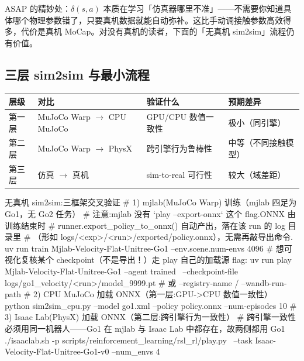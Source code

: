 \begin{insight}\label{ins:rlmc-phys-asap}
ASAP 的精妙处：$\delta(s,a)$ 本质在学习「仿真器哪里不准」——不需要你知道具体哪个物理参数错了，只要真机数据就能自动弥补。这比手动调接触参数高效得多，代价是真机 MoCap。对没有真机的读者，下面的「无真机 sim2sim」流程仍有价值。
\end{insight}

\subsection{三层 sim2sim 与最小流程}

\begin{center}
\small
\begin{tabular}{@{}llll@{}}
\toprule
层级 & 对比 & 验证什么 & 预期差异 \\
\midrule
第一层 & MuJoCo Warp $\to$ CPU MuJoCo & GPU/CPU 数值一致性 & 极小（同引擎） \\
第二层 & MuJoCo Warp $\to$ PhysX & 跨引擎行为鲁棒性 & 中等（不同接触模型） \\
第三层 & 仿真 $\to$ 真机 & sim-to-real 可行性 & 较大（域差距） \\
\bottomrule
\end{tabular}
\end{center}

\begin{codebox}[bash]{无真机 sim2sim:三框架交叉验证}
# 1) mjlab(MuJoCo Warp) 训练（mjlab 四足为 Go1，无 Go2 任务）
#    注意:mjlab 没有 `play --export-onnx` 这个 flag.ONNX 由训练结束时
#    runner.export_policy_to_onnx() 自动产出，落在该 run 的 log 目录里
#    （形如 logs/<exp>/<run>/exported/policy.onnx），无需再敲导出命令.
uv run train Mjlab-Velocity-Flat-Unitree-Go1 --env.scene.num-envs 4096
# 想可视化复核某个 checkpoint（不是导出！）走 play 自己的加载源 flag:
uv run play  Mjlab-Velocity-Flat-Unitree-Go1 --agent trained \
    --checkpoint-file logs/go1_velocity/<run>/model_9999.pt   # 或 --registry-name / --wandb-run-path
# 2) CPU MuJoCo 加载 ONNX（第一层:GPU->CPU 数值一致性）
python sim2sim_cpu.py --model go1.xml --policy policy.onnx --num-episodes 10
# 3) Isaac Lab(PhysX) 加载 ONNX（第二层:跨引擎行为一致性）
#    跨引擎一致性必须用同一机器人——Go1 在 mjlab 与 Isaac Lab 中都存在，故两侧都用 Go1
./isaaclab.sh -p scripts/reinforcement_learning/rsl_rl/play.py \
    --task Isaac-Velocity-Flat-Unitree-Go1-v0 --num_envs 4
\end{codebox}

